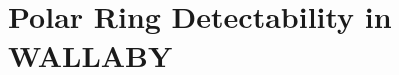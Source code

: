 \documentclass[fleqn,usenatbib]{mnras}
\newcommand{\hi}{\text{H\,\sc{i}}}
\begin{document}




\section{Polar Ring Detectability in WALLABY}\label{Sec:Detectability}
\end{document}
